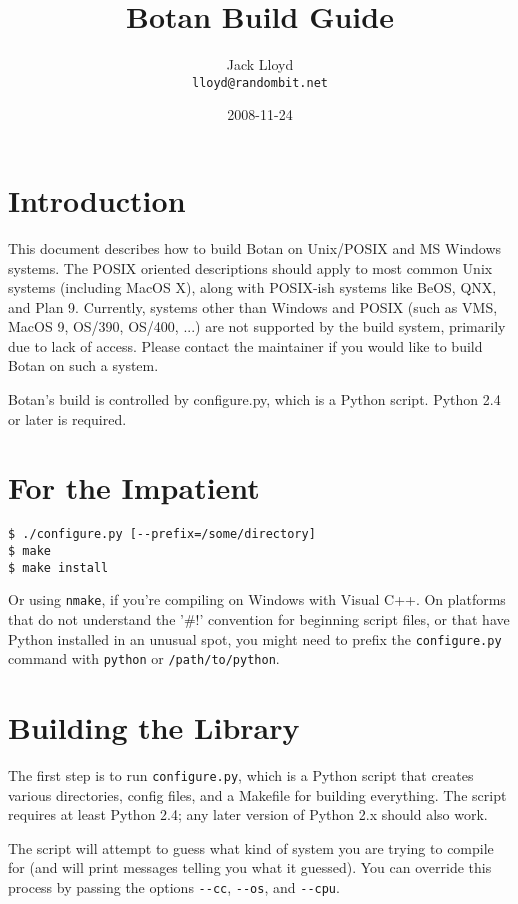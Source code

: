 \documentclass{article}
\title{\textbf{Botan Build Guide}}
\author{Jack Lloyd \\
        \texttt{lloyd@randombit.net}}
\date{2008-11-24}
\newcommand{\filename}[1]{\texttt{#1}}
\begin{document}
\maketitle

\tableofcontents

\parskip=5pt
\pagebreak

\section{Introduction}

This document describes how to build Botan on Unix/POSIX and MS
Windows systems. The POSIX oriented descriptions should apply to most
common Unix systems (including MacOS X), along with POSIX-ish systems
like BeOS, QNX, and Plan 9. Currently, systems other than Windows and
POSIX (such as VMS, MacOS 9, OS/390, OS/400, ...) are not supported by
the build system, primarily due to lack of access. Please contact the
maintainer if you would like to build Botan on such a system.

Botan's build is controlled by configure.py, which is a Python
script. Python 2.4 or later is required.

\section{For the Impatient}

\begin{verbatim}
$ ./configure.py [--prefix=/some/directory]
$ make
$ make install
\end{verbatim}

Or using \verb|nmake|, if you're compiling on Windows with Visual
C++. On platforms that do not understand the '\#!' convention for
beginning script files, or that have Python installed in an unusual
spot, you might need to prefix the \texttt{configure.py} command with
\texttt{python} or \texttt{/path/to/python}.

\section{Building the Library}

The first step is to run \filename{configure.py}, which is a Python
script that creates various directories, config files, and a Makefile
for building everything. The script requires at least Python 2.4; any
later version of Python 2.x should also work.

The script will attempt to guess what kind of system you are trying
to compile for (and will print messages telling you what it guessed).
You can override this process by passing the options \verb|--cc|,
\verb|--os|, and \verb|--cpu|.
\end{document}
